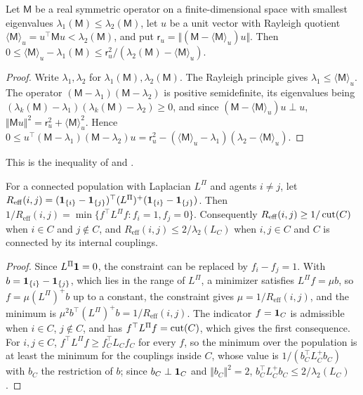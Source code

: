 \begin{lemma}\label{lem:col-kato-temple}
Let $\mathsf M$ be a real symmetric operator on a finite-dimensional space with smallest eigenvalues $\lambda_1(\mathsf M)\le\lambda_2(\mathsf M)$, let $u$ be a unit vector with Rayleigh quotient $\langle\mathsf M\rangle_u=u^\top\mathsf Mu<\lambda_2(\mathsf M)$, and put $\mathsf r_u=\Vert(\mathsf M-\langle\mathsf M\rangle_u)u\Vert$. Then $0\le\langle\mathsf M\rangle_u-\lambda_1(\mathsf M)\le\mathsf r_u^2/(\lambda_2(\mathsf M)-\langle\mathsf M\rangle_u)$.
\end{lemma}
\begin{proof}
Write $\lambda_1,\lambda_2$ for $\lambda_1(\mathsf M),\lambda_2(\mathsf M)$. The Rayleigh principle gives $\lambda_1\le\langle\mathsf M\rangle_u$. The operator $(\mathsf M-\lambda_1)(\mathsf M-\lambda_2)$ is positive semidefinite, its eigenvalues being $(\lambda_k(\mathsf M)-\lambda_1)(\lambda_k(\mathsf M)-\lambda_2)\ge0$, and since $(\mathsf M-\langle\mathsf M\rangle_u)u\perp u$, $\Vert\mathsf Mu\Vert^2=\mathsf r_u^2+\langle\mathsf M\rangle_u^2$. Hence $0\le u^\top(\mathsf M-\lambda_1)(\mathsf M-\lambda_2)u=\mathsf r_u^2-(\langle\mathsf M\rangle_u-\lambda_1)(\lambda_2-\langle\mathsf M\rangle_u)$.
\end{proof}
This is the inequality of \citet{temple1928theory} and \citet{kato1949upper}.

\begin{lemma}\label{lem:col-resistance}
For a connected population with Laplacian $L^\Pi$ and agents $i\neq j$, let $R_{\mathrm{eff}}(i,j)=(\mathbf{1}_{\{i\}}-\mathbf{1}_{\{j\}})^\top(L^\Pi)^+(\mathbf{1}_{\{i\}}-\mathbf{1}_{\{j\}})$. Then $1/R_{\mathrm{eff}}(i,j)=\min\{f^\top L^\Pi f:f_i=1,f_j=0\}$. Consequently $R_{\mathrm{eff}}(i,j)\ge1/\operatorname{cut}(C)$ when $i\in C$ and $j\notin C$, and $R_{\mathrm{eff}}(i,j)\le2/\lambda_2(L_C)$ when $i,j\in C$ and $C$ is connected by its internal couplings.
\end{lemma}
\begin{proof}
Since $L^\Pi\mathbf{1}=0$, the constraint can be replaced by $f_i-f_j=1$. With $b=\mathbf{1}_{\{i\}}-\mathbf{1}_{\{j\}}$, which lies in the range of $L^\Pi$, a minimizer satisfies $L^\Pi f=\mu b$, so $f=\mu(L^\Pi)^+b$ up to a constant, the constraint gives $\mu=1/R_{\mathrm{eff}}(i,j)$, and the minimum is $\mu^2b^\top(L^\Pi)^+b=1/R_{\mathrm{eff}}(i,j)$. The indicator $f=\mathbf{1}_C$ is admissible when $i\in C$, $j\notin C$, and has $f^\top L^\Pi f=\operatorname{cut}(C)$, which gives the first consequence. For $i,j\in C$, $f^\top L^\Pi f\ge f_C^\top L_Cf_C$ for every $f$, so the minimum over the population is at least the minimum for the couplings inside $C$, whose value is $1/(b_C^\top L_C^+b_C)$ with $b_C$ the restriction of $b$; since $b_C\perp\mathbf{1}_C$ and $\Vert b_C\Vert^2=2$, $b_C^\top L_C^+b_C\le2/\lambda_2(L_C)$.
\end{proof}

